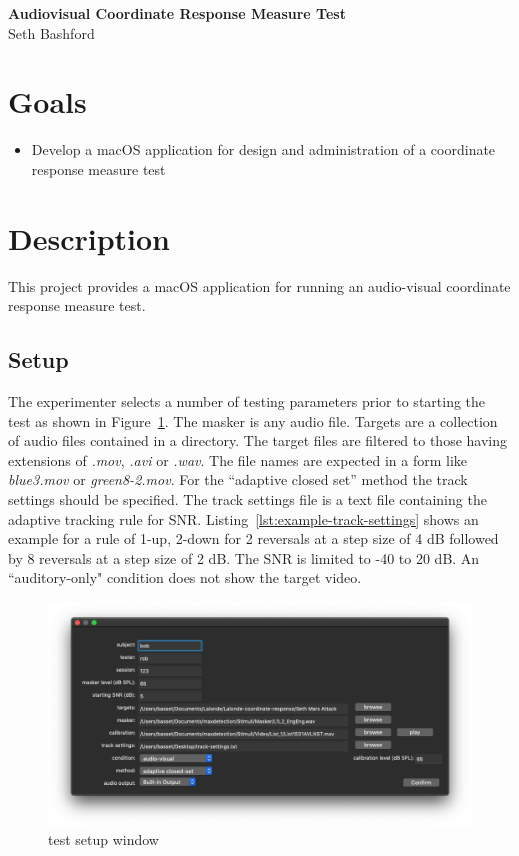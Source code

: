 \documentclass[11pt,pdftex,letterpaper]{article}
\begin{document}
\vspace*{30ex}
\begin{center}
\textbf{Audiovisual Coordinate Response Measure Test}\\
\vspace{4ex}
Seth Bashford
\end{center}
\pagebreak
\tableofcontents
\pagebreak

\section{Goals}
\begin{itemize}
\item Develop a macOS application for design and administration of a coordinate response measure test
\end{itemize}

\section{Description}
This project provides a macOS application for running an audio-visual coordinate response measure test. 

\subsection{Setup}
The experimenter selects a number of testing parameters prior to starting the test as shown in Figure~\ref{fig:test-setup-window}. The masker is any audio file. Targets are a collection of audio files contained in a directory. The target files are filtered to those having extensions of \textit{.mov}, \textit{.avi} or \textit{.wav}. The file names are expected in a form like \textit{blue3.mov} or \textit{green8-2.mov}.  For the ``adaptive closed set'' method the track settings should be specified. The track settings file is a text file containing the adaptive tracking rule for SNR. Listing~\ref{lst:example-track-settings} shows an example for a rule of 1-up, 2-down for 2 reversals at a step size of 4 dB followed by 8 reversals at a step size of 2 dB. The SNR is limited to -40 to 20 dB. An ``auditory-only" condition does not show the target video.

\begin{figure}
\centering
\includegraphics[width = 0.9\linewidth]{test-setup-window.png}
\caption{test setup window}
\label{fig:test-setup-window}
\end{figure}
\end{document}
